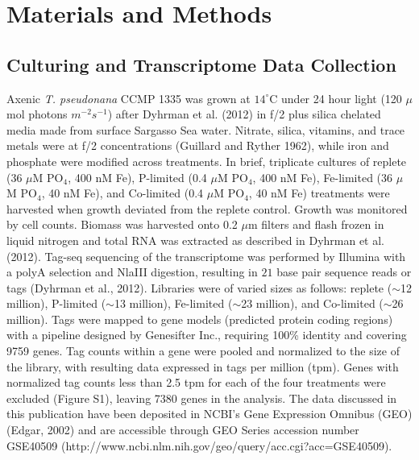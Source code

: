 \section{Materials and Methods}
\subsection{Culturing and Transcriptome Data Collection} 
Axenic \textit{T. pseudonana} CCMP 1335 was grown at $14^{\circ}$C under 24 hour light (120 $\mu$mol photons $m^{-2} s^{-1}$) after Dyhrman et al. (2012) in f/2 plus silica chelated media made from surface Sargasso Sea water. Nitrate, silica, vitamins, and trace metals were at f/2 concentrations (Guillard and Ryther 1962), while iron and phosphate were modified across treatments. In brief, triplicate cultures of replete (36 $\mu$M PO$_{4}$, 400 nM Fe), P-limited (0.4 $\mu$M PO$_{4}$, 400 nM Fe), Fe-limited (36 $\mu$M PO$_{4}$, 40 nM Fe), and Co-limited (0.4 $\mu$M PO$_{4}$, 40 nM Fe) treatments were harvested when growth deviated from the replete control. Growth was monitored by cell counts. Biomass was harvested onto 0.2 $\mu$m filters and flash frozen in liquid nitrogen and total RNA was extracted as described in Dyhrman et al. (2012). Tag-seq sequencing of the transcriptome was performed by Illumina with a polyA selection and NlaIII digestion, resulting in $21$ base pair sequence reads or tags (Dyhrman et al., 2012). Libraries were of varied sizes as follows: replete ($\sim$12 million), P-limited ($\sim$13 million), Fe-limited ($\sim$23 million), and Co-limited ($\sim$26 million). Tags were mapped to gene models (predicted protein coding regions) with a pipeline designed by Genesifter Inc., requiring 100\% identity and covering 9759 genes. Tag counts within a gene were pooled and normalized to the size of the library, with resulting data expressed in tags per million (tpm). Genes with normalized tag counts less than 2.5 tpm for each of the four treatments were excluded (Figure S1), leaving 7380 genes in the analysis. The data discussed in this publication have been deposited in NCBI’s Gene Expression Omnibus (GEO) (Edgar, 2002) and are accessible through GEO Series accession number GSE40509 (http://www.ncbi.nlm.nih.gov/geo/query/acc.cgi?acc=GSE40509).  
